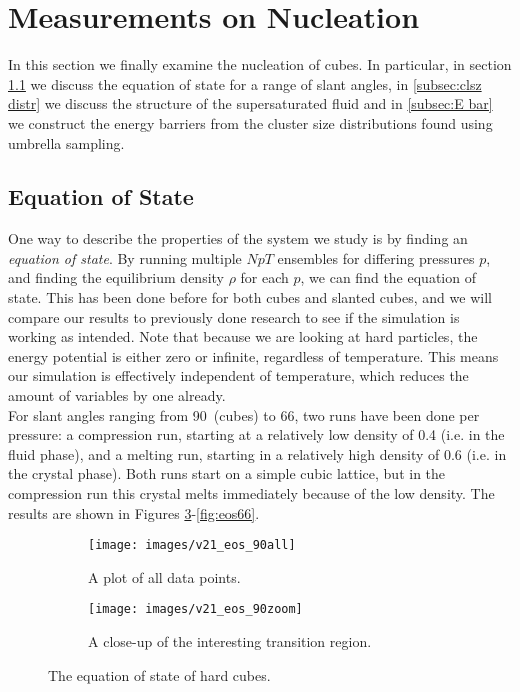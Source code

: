 \documentclass[thesis]{subfiles}
\begin{document}
\section{Measurements on Nucleation}

In this section we finally examine the nucleation of cubes. In particular, in section \ref{subsec:eos} we discuss the equation of state for a range of slant angles, in \ref{subsec:clsz distr} we discuss the structure of the supersaturated fluid and in \ref{subsec:E bar} we construct the energy barriers from the cluster size distributions found using umbrella sampling.

\subsection{Equation of State}\label{subsec:eos}

One way to describe the properties of the system we study is by finding an \emph{equation of state}. By running multiple $NpT$ ensembles for differing pressures $p$, and finding the equilibrium density $\rho$ for each $p$, we can find the equation of state. This has been done before for both cubes and slanted cubes\cite{van2017phase}, and we will compare our results to previously done research to see if the simulation is working as intended. Note that because we are looking at hard particles, the energy potential is either zero or infinite, regardless of temperature. This means our simulation is effectively independent of temperature, which reduces the amount of variables by one already.\\

For slant angles ranging from 90\degr\ (cubes) to 66\degr, two runs have been done per pressure: a compression run, starting at a relatively low density of 0.4 (i.e. in the fluid phase), and a melting run, starting in a relatively high density of 0.6 (i.e. in the crystal phase). Both runs start on a simple cubic lattice, but in the compression run this crystal melts immediately because of the low density. The results are shown in Figures \ref{fig:eos90}-\ref{fig:eos66}. 

\begin{figure}[h]
	\begin{subfigure}[t]{0.475\textwidth}
		\texttt{[image: images/v21\_eos\_90all]}
		\caption{A plot of all data points.}
		\label{fig:eos90-a}
	\end{subfigure}\hfill
	\begin{subfigure}[t]{0.475\textwidth}
		\texttt{[image: images/v21\_eos\_90zoom]}
		\caption{A close-up of the interesting transition region.}
		\label{fig:eos90-b}
	\end{subfigure}
	\caption{The equation of state of hard cubes.}
	\label{fig:eos90}
\end{figure}
\end{document}
